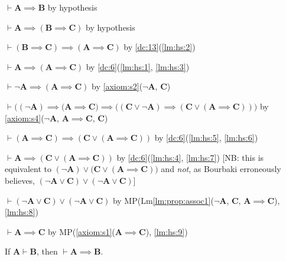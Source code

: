 \documentclass{amsart}%
\newcommand\metavariable[1]{\boldsymbol{#1}}
\begin{document}
\begin{pf}
\item\label{lm:hs:1} $\vdash\metavariable{A}\implies\metavariable{B}$
  by hypothesis
\item\label{lm:hs:2} $\vdash\metavariable{A}\implies(\metavariable{B}\implies\metavariable{C})$
  by hypothesis
\item\label{lm:hs:3} $\vdash(\metavariable{B}\implies\metavariable{C})\implies(\metavariable{A}\implies\metavariable{C})$
  by \ref{dc:13}(\ref{lm:hs:2})
\item\label{lm:hs:4} $\vdash\metavariable{A}\implies(\metavariable{A}\implies\metavariable{C})$
  by \ref{dc:6}(\ref{lm:hs:1}, \ref{lm:hs:3})
\item\label{lm:hs:5} $\vdash\neg\metavariable{A}\implies(\metavariable{A}\implies\metavariable{C})$
  by \ref{axiom:s2}($\neg\metavariable{A}$, $\metavariable{C}$)
\item\label{lm:hs:6} $\vdash\bigl((\neg\metavariable{A})\implies(\metavariable{A}\implies\metavariable{C}\bigr)\implies\bigl((\metavariable{C}\lor\neg\metavariable{A})\implies(\metavariable{C}\lor(\metavariable{A}\implies\metavariable{C}))\bigr)$
  by \ref{axiom:s4}($\neg\metavariable{A}$, $\metavariable{A}\implies\metavariable{C}$, $\metavariable{C}$)
\item\label{lm:hs:7} $\vdash(\metavariable{A}\implies\metavariable{C})\implies(\metavariable{C}\lor(\metavariable{A}\implies\metavariable{C}))$
  by \ref{dc:6}(\ref{lm:hs:5}, \ref{lm:hs:6})
\item\label{lm:hs:8} $\vdash\metavariable{A}\implies(\metavariable{C}\lor(\metavariable{A}\implies\metavariable{C}))$
  by \ref{dc:6}(\ref{lm:hs:4}, \ref{lm:hs:7})
[NB: this is equivalent to $(\neg\metavariable{A})\lor\bigl(\metavariable{C}\lor(\metavariable{A}\implies\metavariable{C})\bigr)$
and \emph{not}, as Bourbaki erroneously believes, $(\neg\metavariable{A}\lor\metavariable{C})\lor(\neg\metavariable{A}\lor\metavariable{C})$]
\item\label{lm:hs:9} $\vdash(\neg\metavariable{A}\lor\metavariable{C})\lor(\neg\metavariable{A}\lor\metavariable{C})$
  by MP(Lm\ref{lm:prop:assoc1}($\neg\metavariable{A}$, $\metavariable{C}$, $\metavariable{A}\implies\metavariable{C}$), \ref{lm:hs:8})
\item\label{lm:hs:10} $\vdash\metavariable{A}\implies\metavariable{C}$
  by MP(\ref{axiom:s1}($\metavariable{A}\implies\metavariable{C}$), \ref{lm:hs:9})
\end{pf}

\begin{dc}\label{dc:14}
If $\metavariable{A}\vdash\metavariable{B}$, then $\vdash\metavariable{A}\implies\metavariable{B}$.
\end{dc}
\end{document}
